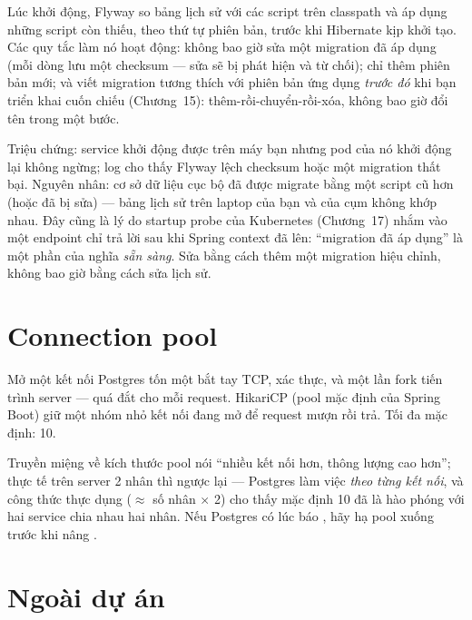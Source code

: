 Lúc khởi động, Flyway so bảng lịch sử với các script trên classpath và
áp dụng những script còn thiếu, theo thứ tự phiên bản, trước khi
Hibernate kịp khởi tạo. Các quy tắc làm nó hoạt động: không bao giờ sửa
một migration đã áp dụng (mỗi dòng lưu một checksum --- sửa sẽ bị phát
hiện và từ chối); chỉ thêm phiên bản mới; và viết migration tương thích
với phiên bản ứng dụng \emph{trước đó} khi bạn triển khai cuốn chiếu
(Chương~15): thêm-rồi-chuyển-rồi-xóa, không bao giờ đổi tên trong một
bước.

\begin{pitfall}
Triệu chứng: service khởi động được trên máy bạn nhưng pod của nó khởi
động lại không ngừng; log cho thấy Flyway lệch checksum hoặc một
migration thất bại. Nguyên nhân: cơ sở dữ liệu cục bộ đã được migrate
bằng một script cũ hơn (hoặc đã bị sửa) --- bảng lịch sử trên laptop của
bạn và của cụm không khớp nhau. Đây cũng là lý do startup probe của
Kubernetes (Chương~17) nhắm vào một endpoint chỉ trả lời sau khi Spring
context đã lên: ``migration đã áp dụng'' là một phần của nghĩa
\emph{sẵn sàng}. Sửa bằng cách thêm một migration hiệu chỉnh, không bao
giờ bằng cách sửa lịch sử.
\end{pitfall}

\section{Connection pool}

Mở một kết nối Postgres tốn một bắt tay TCP, xác thực, và một lần fork
tiến trình server --- quá đắt cho mỗi request. HikariCP (pool mặc định
của Spring Boot) giữ một nhóm nhỏ kết nối đang mở để request mượn rồi
trả. Tối đa mặc định: 10.

\begin{hardware}
Truyền miệng về kích thước pool nói ``nhiều kết nối hơn, thông lượng cao
hơn''; thực tế trên server 2 nhân thì ngược lại --- Postgres làm việc
\emph{theo từng kết nối}, và công thức thực dụng
(\(\approx\) số nhân $\times$ 2) cho thấy mặc định 10 đã là hào phóng
với hai service chia nhau hai nhân. Nếu Postgres có lúc báo
, hãy hạ pool xuống trước khi nâng
.
\end{hardware}

\section{Ngoài dự án}

